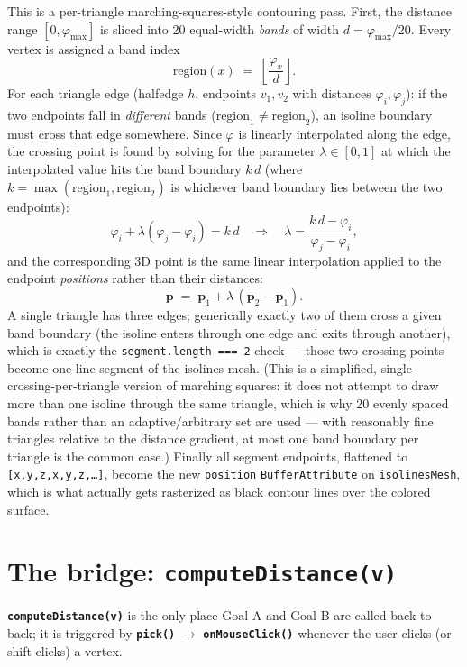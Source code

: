 \documentclass[11pt]{article}
\newcommand{\code}[1]{\texttt{#1}}
\newcommand{\func}[1]{\texttt{\textbf{#1}}}
\begin{document}
This is a per-triangle marching-squares-style contouring pass. First, the distance range
$[0,\varphi_{\max}]$ is sliced into 20 equal-width \emph{bands} of width
$d = \varphi_{\max}/20$. Every vertex is assigned a band index
\[
  \mathrm{region}(x) \;=\; \left\lfloor \frac{\varphi_x}{d} \right\rfloor .
\]
For each triangle edge (halfedge $h$, endpoints $v_1,v_2$ with distances $\varphi_i,
\varphi_j$): if the two endpoints fall in \emph{different} bands
($\mathrm{region}_1\ne\mathrm{region}_2$), an isoline boundary must cross that edge
somewhere. Since $\varphi$ is linearly interpolated along the edge, the crossing point is
found by solving for the parameter $\lambda\in[0,1]$ at which the interpolated value hits
the band boundary $k\,d$ (where $k=\max(\mathrm{region}_1,\mathrm{region}_2)$ is whichever
band boundary lies between the two endpoints):
\[
  \varphi_i + \lambda(\varphi_j-\varphi_i) = k\,d
  \quad\Longrightarrow\quad
  \lambda = \frac{k\,d - \varphi_i}{\varphi_j - \varphi_i},
\]
and the corresponding 3D point is the same linear interpolation applied to the endpoint
\emph{positions} rather than their distances:
\[
  \mathbf{p} \;=\; \mathbf{p}_1 + \lambda\,(\mathbf{p}_2-\mathbf{p}_1).
\]
A single triangle has three edges; generically exactly two of them cross a given band
boundary (the isoline enters through one edge and exits through another), which is exactly
the \code{segment.length === 2} check --- those two crossing points become one line segment
of the isolines mesh. (This is a simplified, single-crossing-per-triangle version of
marching squares: it does not attempt to draw more than one isoline through the same
triangle, which is why 20 evenly spaced bands rather than an adaptive/arbitrary set are
used --- with reasonably fine triangles relative to the distance gradient, at most one band
boundary per triangle is the common case.) Finally all segment endpoints, flattened to
\code{[x,y,z,x,y,z,\ldots]}, become the new \code{position} \code{BufferAttribute} on
\code{isolinesMesh}, which is what actually gets rasterized as black contour lines over the
colored surface.

\section{The bridge: \func{computeDistance(v)}}
\label{sec:bridge}

\func{computeDistance(v)} is the only place Goal A and Goal B are called back to back; it
is triggered by \func{pick()} $\to$ \func{onMouseClick()} whenever the user clicks (or
shift-clicks) a vertex.
\end{document}
